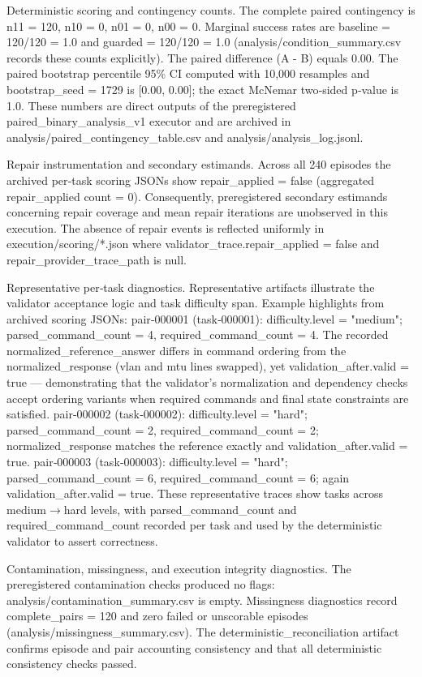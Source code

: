\documentclass[conference]{IEEEtran}
\begin{document}
Deterministic scoring and contingency counts. The complete paired contingency is n11 = 120, n10 = 0, n01 = 0, n00 = 0. Marginal success rates are baseline = 120/120 = 1.0 and guarded = 120/120 = 1.0 (analysis/condition\_summary.csv records these counts explicitly). The paired difference (A - B) equals 0.00. The paired bootstrap percentile 95\% CI computed with 10,000 resamples and bootstrap\_seed = 1729 is [0.00, 0.00]; the exact McNemar two‑sided p‑value is 1.0. These numbers are direct outputs of the preregistered paired\_binary\_analysis\_v1 executor and are archived in analysis/paired\_contingency\_table.csv and analysis/analysis\_log.jsonl.

Repair instrumentation and secondary estimands. Across all 240 episodes the archived per‑task scoring JSONs show repair\_applied = false (aggregated repair\_applied count = 0). Consequently, preregistered secondary estimands concerning repair coverage and mean repair iterations are unobserved in this execution. The absence of repair events is reflected uniformly in execution/scoring/*.json where validator\_trace.repair\_applied = false and repair\_provider\_trace\_path is null.

Representative per‑task diagnostics. Representative artifacts illustrate the validator acceptance logic and task difficulty span. Example highlights from archived scoring JSONs:
\textbullet{} pair‑000001 (task‑000001): difficulty.level = "medium"; parsed\_command\_count = 4, required\_command\_count = 4. The recorded normalized\_reference\_answer differs in command ordering from the normalized\_response (vlan and mtu lines swapped), yet validation\_after.valid = true --- demonstrating that the validator's normalization and dependency checks accept ordering variants when required commands and final state constraints are satisfied.
\textbullet{} pair‑000002 (task‑000002): difficulty.level = "hard"; parsed\_command\_count = 2, required\_command\_count = 2; normalized\_response matches the reference exactly and validation\_after.valid = true.
\textbullet{} pair‑000003 (task‑000003): difficulty.level = "hard"; parsed\_command\_count = 6, required\_command\_count = 6; again validation\_after.valid = true.
These representative traces show tasks across medium\ensuremath{\rightarrow}hard levels, with parsed\_command\_count and required\_command\_count recorded per task and used by the deterministic validator to assert correctness.

Contamination, missingness, and execution integrity diagnostics. The preregistered contamination checks produced no flags: analysis/contamination\_summary.csv is empty. Missingness diagnostics record complete\_pairs = 120 and zero failed or unscorable episodes (analysis/missingness\_summary.csv). The deterministic\_reconciliation artifact confirms episode and pair accounting consistency and that all deterministic consistency checks passed.
\end{document}
